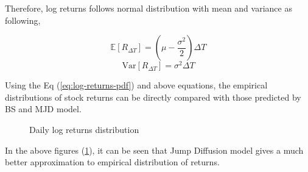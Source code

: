 \documentclass[paper.tex]{subfiles}
\begin{document}
    Therefore, log returns follows normal distribution with mean and variance as following,
    
    \begin{equation}
        \mathbb{E} \left[ R_{\Delta T} \right] = ( \mu - \dfrac{\sigma^{2}}{2})\Delta T
        \label{eq: log-returns-mean}
    \end{equation}
    \begin{equation}
        \text{Var} \left[ R_{\Delta T} \right] = \sigma^{2}\Delta T
        \label{eq: log-returns-variance}
    \end{equation}
    
    Using the Eq (\ref{eq:log-returns-pdf}) and above equations, the empirical distributions of stock returns can be directly compared with those predicted by BS and MJD model.
    
    \begin{figure}[ht!]
        \centering
        \qquad
        \caption{Daily log returns distribution}
        \label{fig: log-returns-distribution}
    \end{figure}
    
    In the above figures (\ref{fig: log-returns-distribution}), it can be seen that Jump Diffusion model gives a much better approximation to empirical distribution of returns.
\end{document}

